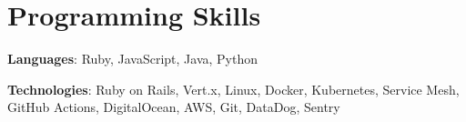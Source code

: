 \documentclass[letterpaper,11pt]{article}
\newcommand{\resumeSubHeadingListStart}{\begin{itemize}[leftmargin=*]}
\newcommand{\resumeSubHeadingListEnd}{\end{itemize}}
\begin{document}
\section{Programming Skills}
 \resumeSubHeadingListStart
   \item{
     \textbf{Languages}{: Ruby, JavaScript, Java, Python }
     \hfill
   \item
     \textbf{Technologies}{: Ruby on Rails, Vert.x, Linux, Docker, Kubernetes, Service Mesh, GitHub Actions, DigitalOcean, AWS, Git, DataDog, Sentry }
   }
 \resumeSubHeadingListEnd

\end{document}

